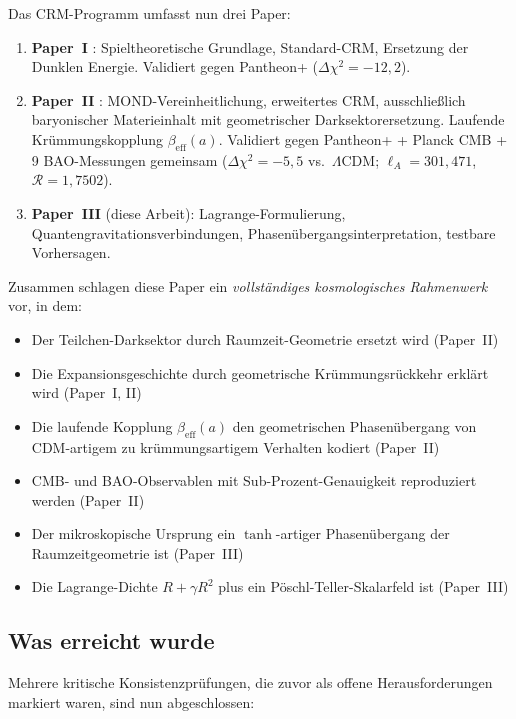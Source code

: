 \documentclass[11pt,a4paper]{article}
\begin{document}
Das CRM-Programm umfasst nun drei Paper:
\begin{enumerate}
\item \textbf{Paper~I} \cite{Geiger2026}: Spieltheoretische Grundlage, Standard-CRM, Ersetzung der Dunklen Energie. Validiert gegen Pantheon+ ($\Delta\chi^2 = -12{,}2$).
\item \textbf{Paper~II} \cite{Geiger2026b}: MOND-Vereinheitlichung, erweitertes CRM, ausschlie\ss lich baryonischer Materieinhalt mit geometrischer Darksektorersetzung. Laufende Kr\"ummungskopplung $\beta_{\mathrm{eff}}(a)$. Validiert gegen Pantheon+ + Planck CMB + 9 BAO-Messungen gemeinsam ($\Delta\chi^2 = -5{,}5$ vs.\ $\Lambda$CDM; $\ell_A = 301{,}471$, $\mathcal{R} = 1{,}7502$).
\item \textbf{Paper~III} (diese Arbeit): Lagrange-Formulierung, Quantengravitationsverbindungen, Phasen\"ubergangsinterpretation, testbare Vorhersagen.
\end{enumerate}

Zusammen schlagen diese Paper ein \textit{vollst\"andiges kosmologisches Rahmenwerk} vor, in dem:
\begin{itemize}
\item Der Teilchen-Darksektor durch Raumzeit-Geometrie ersetzt wird (Paper~II)
\item Die Expansionsgeschichte durch geometrische Kr\"ummungsr\"uckkehr erkl\"art wird (Paper~I, II)
\item Die laufende Kopplung $\beta_{\mathrm{eff}}(a)$ den geometrischen Phasen\"ubergang von CDM-artigem zu kr\"ummungsartigem Verhalten kodiert (Paper~II)
\item CMB- und BAO-Observablen mit Sub-Prozent-Genauigkeit reproduziert werden (Paper~II)
\item Der mikroskopische Ursprung ein $\tanh$-artiger Phasen\"ubergang der Raumzeitgeometrie ist (Paper~III)
\item Die Lagrange-Dichte $R + \gamma R^2$ plus ein P\"oschl-Teller-Skalarfeld ist (Paper~III)
\end{itemize}

\subsection{Was erreicht wurde}

Mehrere kritische Konsistenzpr\"ufungen, die zuvor als offene Herausforderungen markiert waren, sind nun abgeschlossen:
\end{document}
